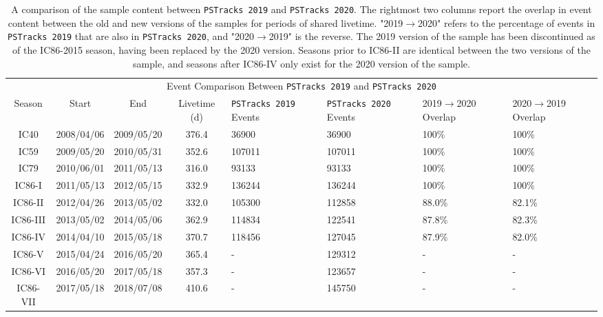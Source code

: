 \documentclass[aps,10pt,prd,twocolumn,floats,letterpaper,showpacs,nofootinbib,bibnotes,notitlepage,superscriptaddress,floatfix]{revtex4-1}
\begin{document}
\begin{table}[p]
\centering
\begin{ruledtabular}
\begin{tabular}{ccccp{2cm}p{2cm}p{2cm}p{2cm}}
\multicolumn{8}{c}{Event Comparison Between {\tt PSTracks 2019} and {\tt PSTracks 2020}} \\[0.1cm]
Season & Start & End & Livetime (d) & {\tt PSTracks 2019} Events & {\tt PSTracks 2020} Events & 2019$\rightarrow$2020 Overlap & 2020$\rightarrow$2019 Overlap \\ 
IC40 & 2008/04/06 & 2009/05/20 & 376.4 & 36900 & 36900 & 100\% & 100\% \\
IC59 & 2009/05/20 & 2010/05/31 & 352.6 & 107011 & 107011 & 100\% & 100\% \\
IC79 & 2010/06/01 & 2011/05/13 & 316.0 & 93133 & 93133 & 100\% & 100\% \\
IC86-I & 2011/05/13 & 2012/05/15 & 332.9 & 136244 & 136244 & 100\% & 100\% \\
IC86-II & 2012/04/26\footnotemark & 2013/05/02 & 332.0 & 105300 & 112858 & 88.0\% & 82.1\% \\
IC86-III & 2013/05/02 & 2014/05/06 & 362.9 & 114834 & 122541 & 87.8\% & 82.3\% \\
IC86-IV & 2014/04/10\footnotemark & 2015/05/18 & 370.7 & 118456 & 127045 & 87.9\% & 82.0\% \\
IC86-V & 2015/04/24\footnotemark & 2016/05/20 & 365.4 & - & 129312 & - & - \\
IC86-VI & 2016/05/20 & 2017/05/18 & 357.3 & - & 123657 & - & - \\
IC86-VII & 2017/05/18 & 2018/07/08 & 410.6 & - & 145750 & - & - \\
\end{tabular}
\end{ruledtabular}
\caption[]{A comparison of the sample content between {\tt PSTracks 2019} and {\tt PSTracks 2020}. The rightmost two columns report the overlap in event content between the old and new versions of the samples for periods of shared livetime. "2019$\rightarrow$2020" refers to the percentage of events in {\tt PSTracks 2019} that are also in {\tt PSTracks 2020}, and "2020$\rightarrow$2019" is the reverse. The 2019 version of the sample has been discontinued as of the IC86-2015 season, having been replaced by the 2020 version. Seasons prior to IC86-II are identical between the two versions of the sample, and seasons after IC86-IV only exist for the 2020 version of the sample.}\label{tab:v2v3evtcontent}
\end{table}
\end{document}
